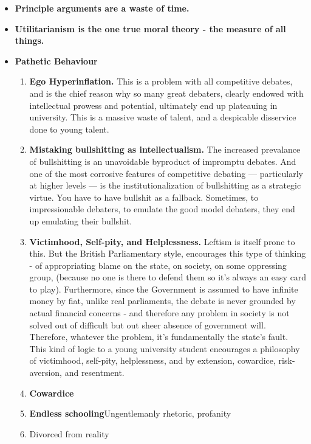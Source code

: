 \begin{itemize}
    \item \textbf{Principle arguments are a waste of time.}
    \item \textbf{Utilitarianism is the one true moral theory - the measure of all things.}
    \item \textbf{Pathetic Behaviour } 
        \begin{enumerate}
            \item \textbf{Ego Hyperinflation.} This is a problem with all competitive debates, and is the chief reason why so many great debaters, clearly endowed with intellectual prowess and potential, ultimately end up plateauing in university. This is a massive waste of talent, and a despicable disservice done to young talent. 
            \item \textbf{Mistaking bullshitting as intellectualism.} The increased prevalance of bullshitting is an unavoidable byproduct of impromptu debates. And one of the most corrosive features of competitive debating — particularly at higher levels — is the institutionalization of bullshitting as a strategic virtue. You have to have bullshit as a fallback. Sometimes, to impressionable debaters, to emulate the good model debaters, they end up emulating their bullshit.
            
            \item \textbf{Victimhood, Self-pity, and Helplessness.} Leftism is itself prone to this. But the British Parliamentary style, encourages this type of thinking - of appropriating blame on the state, on society, on some oppressing group, (because no one is there to defend them so it's always an easy card to play). Furthermore, since the Government is assumed to have infinite money by fiat, unlike real parliaments, the debate is never grounded by actual financial concerns - and therefore any problem in society is not solved out of difficult but out sheer absence of government will. Therefore, whatever the problem, it's fundamentally the state's fault. This kind of logic to a young university student encourages a philosophy of victimhood, self-pity, helplessness, and by extension, cowardice, risk-aversion, and resentment.
            \item \textbf{Cowardice}
            
            \item \textbf{Endless schooling}Ungentlemanly rhetoric, profanity
            \item Divorced from reality
    
    
        \end{enumerate}
    



\end{itemize}
